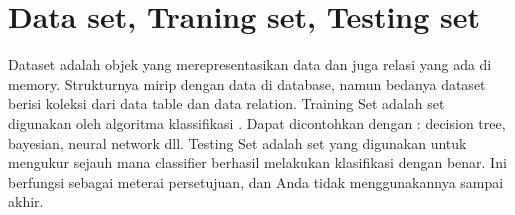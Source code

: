 \section{Data set, Traning set, Testing set}
Dataset adalah objek yang merepresentasikan data dan juga relasi yang ada di memory. Strukturnya mirip dengan data di database, namun bedanya dataset berisi koleksi dari data table dan data relation. Training Set adalah set digunakan oleh algoritma klassifikasi . Dapat dicontohkan dengan : decision tree, bayesian, neural network dll. Testing Set adalah set yang digunakan untuk mengukur sejauh mana classifier berhasil melakukan klasifikasi dengan benar. Ini berfungsi sebagai meterai persetujuan, dan Anda tidak menggunakannya sampai akhir.